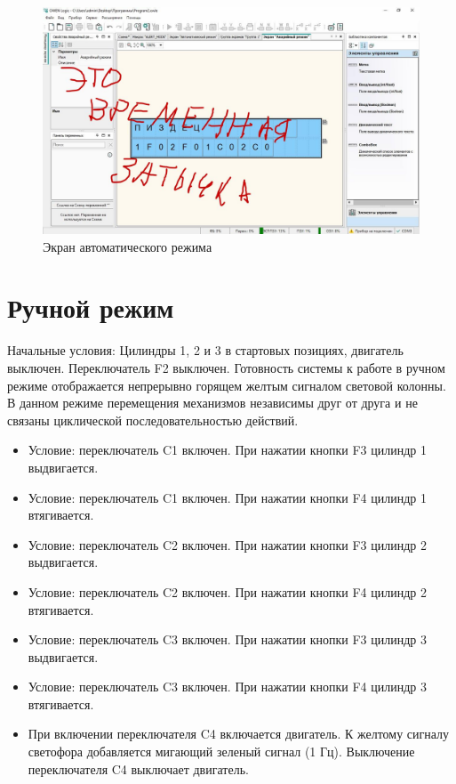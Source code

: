 \begin{figure}[pb]
    \centering
    \includegraphics[scale=0.30]{fig/4.1.jpg}
    \caption{Экран автоматического режима}
    \label{fig:auto_screen}
\end{figure}


\newpage
\section{Ручной режим}
Начальные условия: Цилиндры 1, 2 и 3 в стартовых позициях, двигатель
выключен. Переключатель F2 выключен. Готовность системы к работе в ручном
режиме отображается непрерывно горящем желтым сигналом световой колонны.
В данном режиме перемещения механизмов независимы друг от друга и не
связаны циклической последовательностью действий.

\begin{itemize}
    \item Условие: переключатель C1 включен. При нажатии кнопки F3 цилиндр 1 выдвигается.
    \item Условие: переключатель C1 включен. При нажатии кнопки F4 цилиндр 1 втягивается.
    \item Условие: переключатель C2 включен. При нажатии кнопки F3 цилиндр 2 выдвигается.
    \item Условие: переключатель C2 включен. При нажатии кнопки F4 цилиндр 2 втягивается.
    \item Условие: переключатель C3 включен. При нажатии кнопки F3 цилиндр 3 выдвигается.
    \item Условие: переключатель C3 включен. При нажатии кнопки F4 цилиндр 3 втягивается.
    \item При включении переключателя C4 включается двигатель. К желтому сигналу светофора добавляется мигающий зеленый сигнал (1 Гц). Выключение переключателя C4 выключает двигатель.
\end{itemize}

